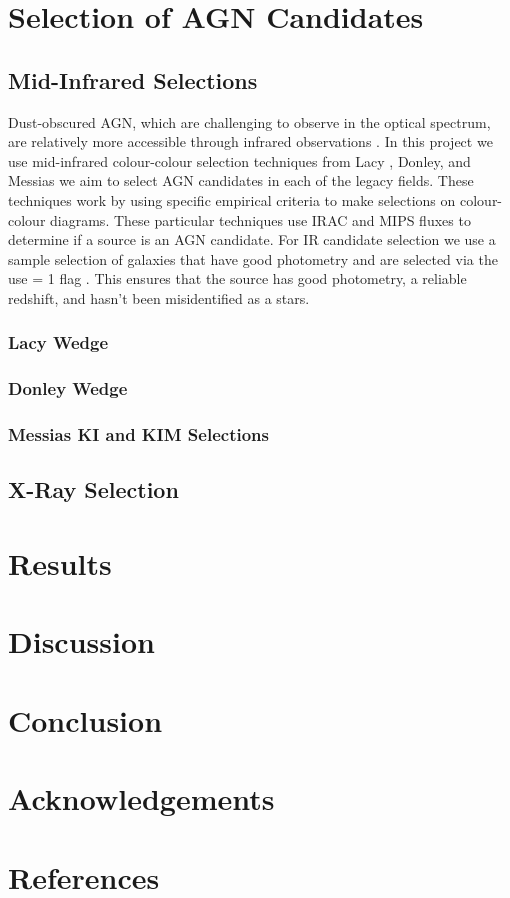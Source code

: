 \documentclass[12pt]{iopart}
\begin{document}
\section{Selection of AGN Candidates}
\subsection{Mid-Infrared Selections}
Dust-obscured AGN, which are challenging to observe in the optical spectrum, are relatively more accessible through infrared observations \cite{yutani_origin_2022}. In this project we use mid-infrared colour-colour selection techniques from Lacy \cite{lacy_obscured_2004, lacy_optical_2007}, Donley\cite{donley_spitzer_2007, donley_identifying_2012}, and Messias \cite{messias_new_2012, messias_dependency_2014} we aim to select AGN candidates in each of the legacy fields. These techniques work by using specific empirical criteria to make selections on colour-colour diagrams. These particular techniques use IRAC and MIPS fluxes to determine if a source is an AGN candidate. For IR candidate selection we use a sample selection of galaxies that have good photometry and are selected via the use = 1 flag \cite{straatman_fourstar_2016}. This ensures that the source has good photometry, a reliable redshift, and hasn't been misidentified as a stars.
\subsubsection{Lacy Wedge}
\subsubsection{Donley Wedge}
\subsubsection{Messias KI and KIM Selections}
\subsection{X-Ray Selection}
\newpage
\section{Results}
\section{Discussion}
\section{Conclusion}
\section{Acknowledgements}
\section{References}



\end{document}

